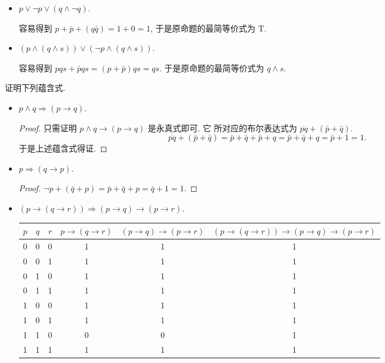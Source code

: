 \documentclass[10pt,UTF8]{ctexbook} %
\begin{document}
\begin{exercise}
\begin{itemize}[itemsep=0pt]
        \item $p \vee \lnot p \vee (q \wedge \lnot q)$.
        \begin{sol}
            容易得到 $p + \bar p + (q \bar q) = 1 + 0 = 1$,
            于是原命题的最简等价式为 T.
        \end{sol}

        \item $(p \wedge (q \wedge s)) \vee (\lnot p \wedge (q \wedge s))$.
        \begin{sol}
            容易得到 $pqs + \bar p qs = (p + \bar p)qs = qs$.
            于是原命题的最简等价式为 $q \wedge s$.
        \end{sol}
    \end{itemize}
\end{exercise}

\begin{exercise}
    证明下列蕴含式.
    \begin{itemize}[itemsep=0pt]
        \item $p \wedge q \Longrightarrow (p \to q)$.
        \begin{proof}
            只需证明 $p \wedge q \to (p \to q)$
            是永真式即可. 它
            所对应的布尔表达式为 $\overline{pq} + (\bar p + \bar q)$.
            \[ \overline{pq} + (\bar p + \bar q)
            = \bar p + \bar q + \bar p + q
            = \bar p + \bar q + q = \bar p + 1 = 1. \]
            于是上述蕴含式得证.
        \end{proof}
        \item $p \Longrightarrow (q \to p)$.
        \begin{proof}
            $\lnot p + \left( \bar q + p \right) = \bar p + \bar q + p
            = \bar q + 1 = 1$.
        \end{proof}
        \item $(p \to (q \to r)) \Longrightarrow (p \to q) \to (p \to r)$.
        \begin{table}[H]
            \centering
            \begin{tabular}{cccccc}
                \hline
                $p$ & $q$ & $r$ & $p \to (q \to r)$ & $(p \to q) \to (p \to r)$ & $(p \to (q \to r)) \rightarrow (p \to q) \to (p \to r)$ \\
                \hline 
                0 & 0 & 0 & 1 & 1 & 1 \\
                0 & 0 & 1 & 1 & 1 & 1 \\
                0 & 1 & 0 & 1 & 1 & 1 \\
                0 & 1 & 1 & 1 & 1 & 1 \\
                1 & 0 & 0 & 1 & 1 & 1 \\
                1 & 0 & 1 & 1 & 1 & 1 \\
                1 & 1 & 0 & 0 & 0 & 1 \\
                1 & 1 & 1 & 1 & 1 & 1 \\
                \hline
            \end{tabular}
        \end{table}
    \end{itemize}
\end{exercise}
\end{document}
